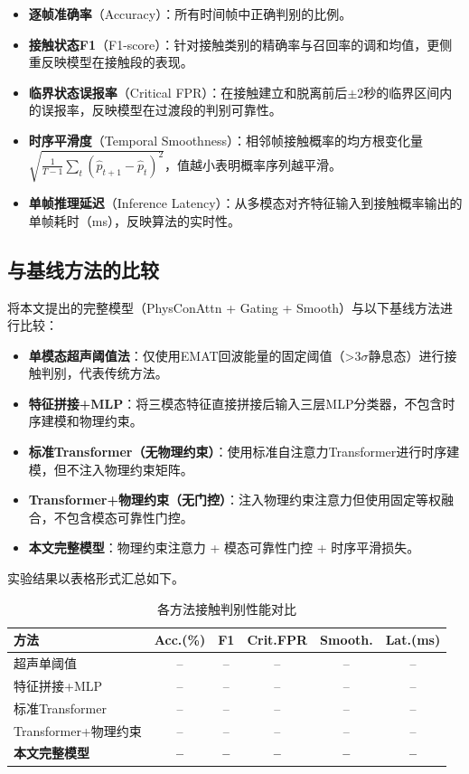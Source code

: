 \begin{itemize}
\item \textbf{逐帧准确率}（Accuracy）：所有时间帧中正确判别的比例。
\item \textbf{接触状态F1}（F1-score）：针对接触类别的精确率与召回率的调和均值，更侧重反映模型在接触段的表现。
\item \textbf{临界状态误报率}（Critical FPR）：在接触建立和脱离前后$\pm 2$秒的临界区间内的误报率，反映模型在过渡段的判别可靠性。
\item \textbf{时序平滑度}（Temporal Smoothness）：相邻帧接触概率的均方根变化量$\sqrt{\frac{1}{T-1}\sum_t (\hat{p}_{t+1} - \hat{p}_t)^2}$，值越小表明概率序列越平滑。
\item \textbf{单帧推理延迟}（Inference Latency）：从多模态对齐特征输入到接触概率输出的单帧耗时（ms），反映算法的实时性。
\end{itemize}

\subsection{与基线方法的比较}\label{sec:baseline_comparison}

将本文提出的完整模型（PhysConAttn + Gating + Smooth）与以下基线方法进行比较：

\begin{itemize}
\item \textbf{单模态超声阈值法}：仅使用EMAT回波能量的固定阈值（>3$\sigma$静息态）进行接触判别，代表传统方法。
\item \textbf{特征拼接+MLP}：将三模态特征直接拼接后输入三层MLP分类器，不包含时序建模和物理约束。
\item \textbf{标准Transformer（无物理约束）}：使用标准自注意力Transformer进行时序建模，但不注入物理约束矩阵。
\item \textbf{Transformer+物理约束（无门控）}：注入物理约束注意力但使用固定等权融合，不包含模态可靠性门控。
\item \textbf{本文完整模型}：物理约束注意力 + 模态可靠性门控 + 时序平滑损失。
\end{itemize}

实验结果以表格形式汇总如下。%

\begin{table}[htbp]
\centering
\caption{各方法接触判别性能对比}
\label{tab:results}
\begin{tabular}{lccccc}
\toprule
\textbf{方法} & \textbf{Acc.(\%)} & \textbf{F1} & \textbf{Crit.FPR} & \textbf{Smooth.} & \textbf{Lat.(ms)} \\
\midrule
超声单阈值 & -- & -- & -- & -- & -- \\
特征拼接+MLP & -- & -- & -- & -- & -- \\
标准Transformer & -- & -- & -- & -- & -- \\
Transformer+物理约束 & -- & -- & -- & -- & -- \\
\textbf{本文完整模型} & \textbf{--} & \textbf{--} & \textbf{--} & \textbf{--} & \textbf{--} \\
\bottomrule
\end{tabular}
\end{table}

